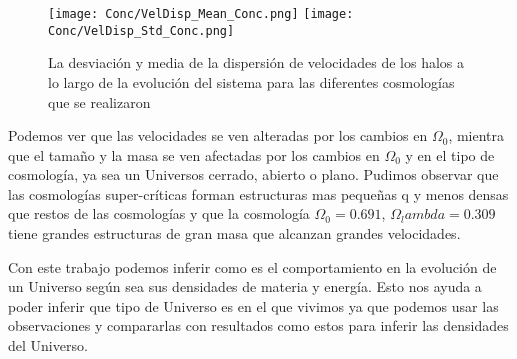 \begin{figure}[H]
      \centering
      \texttt{[image: Conc/VelDisp\_Mean\_Conc.png]}
      \texttt{[image: Conc/VelDisp\_Std\_Conc.png]}
      \caption[Evolución de la desviación y media de la dispersión de velocidades los halos para todas las cosmologías]{La desviación y media de la dispersión de velocidades de los halos a lo largo de la evolución del sistema para las diferentes cosmologías que se realizaron}
      \label{fig:Conc_VelDisp}
\end{figure}

Podemos ver que las velocidades se ven alteradas por los cambios en $\Omega_0$, mientra que el tamaño y la masa se ven afectadas por los cambios en $\Omega_0$ y en el tipo de cosmología, ya sea un Universos cerrado, abierto o plano. Pudimos observar que las cosmologías super-críticas forman estructuras mas pequeñas q y menos densas que restos de las cosmologías y que la cosmología $\Omega_0 = 0.691$, $\Omega_lambda = 0.309$ tiene grandes estructuras de gran masa que alcanzan grandes velocidades.

Con este trabajo podemos inferir como es el comportamiento en la evolución de un Universo según sea sus densidades de materia y energía. Esto nos ayuda a poder inferir que tipo de Universo es en el que vivimos ya que podemos usar las observaciones y compararlas con resultados como estos para inferir las densidades del Universo.
 

\lhead[\fancyplain{}{}]%
      {\fancyplain{}{\bfseries\rightmark}}
